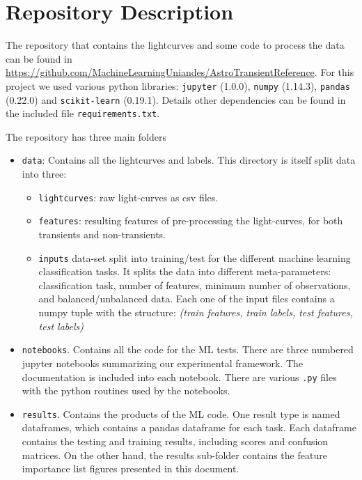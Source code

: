 \documentclass[a4paper,fleqn,usenatbib]{mnras}
\begin{document}
\section{Repository Description} \label{section_code}

The repository that contains the lightcurves and some code to process
the data can be found in
\url{https://github.com/MachineLearningUniandes/AstroTransientReference}.
For
this project we used various python libraries: \texttt{jupyter}
(1.0.0), \texttt{numpy} (1.14.3), \texttt{pandas} (0.22.0) and
\texttt{scikit-learn} (0.19.1). Details other dependencies can be
found in the included file \texttt{requirements.txt}. 

The repository has three main folders

\begin{itemize}
\item \texttt{data}: Contains all the lightcurves and labels. 
  This directory is itself split data into three: 
\begin{itemize}
\item \texttt{lightcurves}: raw light-curves as csv files.
\item \texttt{features}:  resulting features of pre-processing the
light-curves, for both transients and non-transients. 
\item \texttt{inputs} data-set split into training/test for the
  different machine learning classification tasks. 
It splits the data into different meta-parameters:
classification task, number of features, minimum number of
observations, and balanced/unbalanced data. Each one of the input
files contains a numpy tuple with the structure: \textit{(train
  features, train labels, test features, test labels)} 
\end{itemize}
\item \texttt{notebooks}. Contains all the code for the ML tests. 
There are three numbered jupyter notebooks summarizing our experimental framework. 
The documentation is included into each notebook.
There are various \texttt{.py} files with the python routines used by
the  notebooks. 
\item \texttt{results}. Contains the products of the ML code. 
  One result type is named dataframes, which contains a pandas
  dataframe for each task. Each dataframe contains the testing and
  training results, including scores and confusion matrices.  
  On the other hand, the results sub-folder contains the feature
  importance list figures presented in this document.  
\end{itemize}
\end{document}
